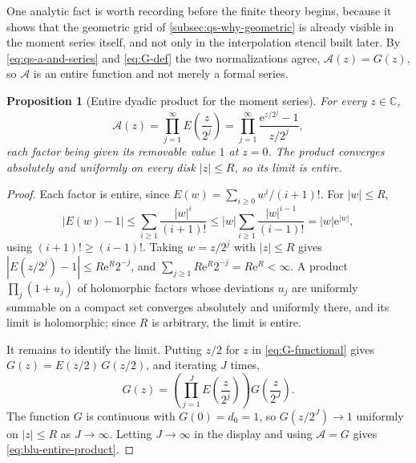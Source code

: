 \documentclass[11pt,oneside]{article}
\newtheorem{proposition}[theorem]{Proposition}
\theoremstyle{definition}
\theoremstyle{remark}
\newcommand{\C}{\mathbb C}
\newcommand{\e}{\mathrm e}
\begin{document}
One analytic fact is worth recording before the finite theory begins, because it shows that
the geometric grid of \cref{subsec:qs-why-geometric} is already visible in the moment series
itself, and not only in the interpolation stencil built later.  By
\eqref{eq:qs-a-and-series} and \eqref{eq:G-def} the two normalizations agree,
$\mathscr A(z)=G(z)$, so $\mathscr A$ is an entire function and not merely a formal series.

\begin{proposition}[Entire dyadic product for the moment series]
\label{prop:blu-entire-product}
For every $z\in\C$,
\begin{equation}
 \mathscr A(z)=\prod_{j=1}^{\infty}E\!\left(\frac z{2^j}\right)
 =\prod_{j=1}^{\infty}\frac{\e^{z/2^j}-1}{z/2^j},          \label{eq:blu-entire-product}
\end{equation}
each factor being given its removable value $1$ at $z=0$.  The product converges absolutely
and uniformly on every disk $|z|\le R$, so its limit is entire.
\end{proposition}

\begin{proof}
Each factor is entire, since $E(w)=\sum_{i\ge0}w^i/(i+1)!$.  For $|w|\le R$,
\begin{equation*}
 |E(w)-1|\le\sum_{i\ge1}\frac{|w|^i}{(i+1)!}
 \le|w|\sum_{i\ge1}\frac{|w|^{i-1}}{(i-1)!}
 =|w|\e^{|w|},
\end{equation*}
using $(i+1)!\ge(i-1)!$.  Taking $w=z/2^j$ with $|z|\le R$ gives
$|E(z/2^j)-1|\le R\e^{R}2^{-j}$, and $\sum_{j\ge1}R\e^R2^{-j}=R\e^R<\infty$.  A product
$\prod_j(1+u_j)$ of holomorphic factors whose deviations $u_j$ are uniformly summable on a
compact set converges absolutely and uniformly there, and its limit is holomorphic; since
$R$ is arbitrary, the limit is entire.

It remains to identify the limit.  Putting $z/2$ for $z$ in \eqref{eq:G-functional} gives
$G(z)=E(z/2)\,G(z/2)$, and iterating $J$ times,
\begin{equation*}
 G(z)=\left(\prod_{j=1}^{J}E\!\left(\frac z{2^j}\right)\right)G\!\left(\frac z{2^J}\right).
\end{equation*}
The function $G$ is continuous with $G(0)=d_0=1$, so $G(z/2^J)\to1$ uniformly on $|z|\le R$
as $J\to\infty$.  Letting $J\to\infty$ in the display and using $\mathscr A=G$ gives
\eqref{eq:blu-entire-product}.
\end{proof}
\end{document}
